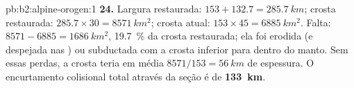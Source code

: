 \begin{solution}{pb:b2:alpine-orogen:1}
\textbf{24.} Largura restaurada: $153 + 132.7 = \qty{285.7}{km}$; crosta restaurada:
$285.7\times30 = \qty{8571}{km^2}$; crosta atual: $153\times45 = \qty{6885}{km^2}$. Falta:
$8571 - 6885 = \qty{1686}{km^2}$, \qty{19.7}{\percent} da crosta restaurada; ela foi
erodida (e despejada nas ) ou subductada com a crosta inferior para dentro do
manto. Sem essas perdas, a crosta teria em média $8571/153 = \qty{56}{km}$ de espessura.
O encurtamento colisional total através da seção é de
\textbf{\qty[text-series-to-math=true]{133}{km}}.
\end{solution}
